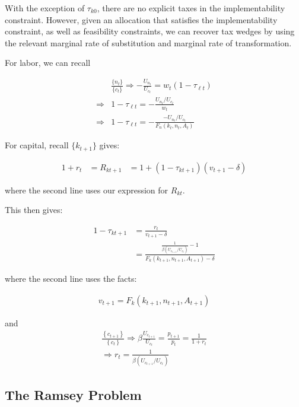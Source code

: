 \documentclass[10pt]{article}
\begin{document}
With the exception of $\tau_{k 0}$, there are no explicit taxes in the implementability constraint. However, given an allocation that satisfies the implementability constraint, as well as feasibility constraints, we can recover tax wedges by using the relevant marginal rate of substitution and marginal rate of transformation.

For labor, we can recall 

\begin{align}
    &\frac{\{n_t\}}{\{c_t\}} \Rightarrow -\frac{U_{n_t}}{U_{c_t}}=w_t\left(1-\tau_{\ell t}\right) \\
    \Rightarrow &1 - \tau_{\ell t} = -\frac{U_{n_t}/U_{c_t}}{w_t} \\
    \Rightarrow &1 - \tau_{\ell t} =   -\frac{-U_{n_t}/U_{c_t}}{F_n\left(k_t, n_t, A_t\right)}
\end{align}

For capital, recall $\{k_{t+1}\}$ gives:

\begin{align}
    1+r_t&=R_{k t+1} 
    &= 1+\left(1-\tau_{k t+1}\right)\left(v_{t+1}-\delta\right)
\end{align}

where the second line uses our expression for $R_{k t}$.

This then gives: 

\begin{align}
    1-\tau_{k t+1}&=\frac{r_t}{v_{t+1}-\delta} \\
    &=\frac{\frac{1}{\beta\left(U_{c_{t+1}} / U_{c_t}\right)}-1}{F_k\left(k_{t+1}, n_{t+1}, A_{t+1}\right)-\delta}
\end{align}

where the second line uses the facts:

\begin{align}
    v_{t+1} = F_k\left(k_{t+1}, n_{t+1}, A_{t+1}\right) 
\end{align}

and 
\begin{align}
    \frac{\left\{c_{t+1}\right\}}{\left\{c_t\right\}} \Rightarrow \beta \frac{U_{c_{t+1}}}{U_{c_t}}=\frac{p_{t+1}}{p_t}=\frac{1}{1+r_t} \\
    \Rightarrow r_t = \frac{1}{\beta\left(U_{c_{t+1}} / U_{c_t}\right)}
\end{align}

\subsection{The Ramsey Problem}
\end{document}
